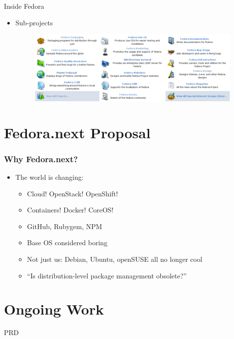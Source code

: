 \documentclass{beamer}
\begin{document}
\begin{frame}{Inside Fedora}
  \begin{itemize}
    \item Sub-projects
      \begin{figure}[htbp]
        \centering
        \includegraphics[width=.9\textwidth]{subprojects.png}
      \end{figure}
  \end{itemize}
\end{frame}

\section{Fedora.next Proposal}
\begin{frame}
  \frametitle{Why Fedora.next?}
  \begin{itemize}
    \item The world is changing:
      \begin{itemize}
        \item Cloud! OpenStack! OpenShift!
        \item Containers! Docker! CoreOS!
        \item GitHub, Rubygem, NPM
        \item Base OS considered boring
        \item Not just us: Debian, Ubuntu, openSUSE all \alert{no
          longer cool}
        \item ``Is distribution-level package management obsolete?''
      \end{itemize}
  \end{itemize}
\end{frame}

\section{Ongoing Work}

\begin{frame}{PRD}
\end{frame}
\end{document}
